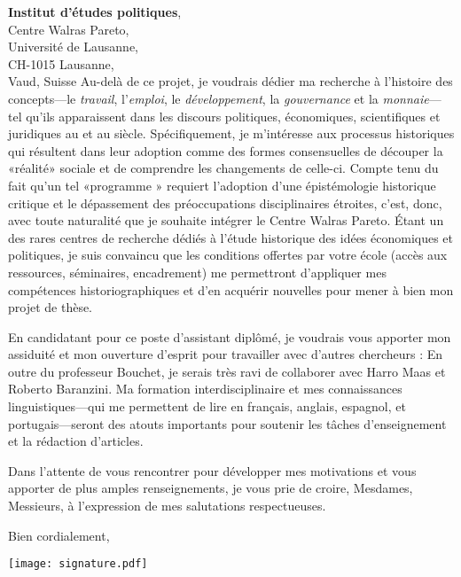 \begin{letter}{\textbf{Institut d'études politiques}, \\
    Centre Walras Pareto,\\
    Université de Lausanne,\\
    CH-1015 Lausanne,\\
    Vaud, Suisse}
  Au-delà de ce projet, je voudrais dédier ma recherche à
  l'histoire des concepts---le \textit{travail},
  l'\textit{emploi}, le \textit{développement}, la
  \textit{gouvernance} et la \textit{monnaie}---tel qu'ils
  apparaissent dans les discours politiques, économiques,
  scientifiques et juridiques au  et au  siècle.
  Spécifiquement, je m'intéresse aux processus historiques qui
  résultent dans leur adoption comme des formes consensuelles de
  découper la «réalité» sociale et de comprendre les changements
  de celle-ci. Compte tenu du fait qu'un tel «programme » requiert
  l'adoption d'une épistémologie historique critique et le
  dépassement des préoccupations disciplinaires étroites, c'est,
  donc, avec toute naturalité que je souhaite intégrer le Centre
  Walras Pareto. Étant un des rares centres de recherche dédiés à
  l'étude historique des idées économiques et politiques, je suis
  convaincu que les conditions offertes par votre école (accès aux
  ressources, séminaires, encadrement) me permettront d'appliquer
  mes compétences historiographiques et d'en acquérir nouvelles
  pour mener à bien mon projet de thèse.

  En candidatant pour ce poste d'assistant diplômé, je voudrais
  vous apporter mon assiduité et mon ouverture d'esprit pour
  travailler avec d'autres chercheurs : En outre du professeur
  Bouchet, je serais très ravi de collaborer avec Harro Maas et
  Roberto Baranzini. Ma formation interdisciplinaire et mes
  connaissances linguistiques---qui me permettent de lire en
  français, anglais, espagnol, et portugais---seront des atouts
  importants pour soutenir les tâches d'enseignement et la
  rédaction d'articles.

  Dans l'attente de vous rencontrer pour développer mes
  motivations et vous apporter de plus amples renseignements, je
  vous prie de croire, Mesdames, Messieurs, à l'expression de mes
  salutations respectueuses.
  
  \closing{Bien cordialement,}
  \texttt{[image: signature.pdf]}\\ 
\end{letter}


